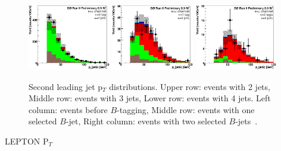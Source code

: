 \begin{figure}[!h!tbp]
\begin{center}
\includegraphics[width=0.32\textwidth]{eps/DataBackground/EMU/emu_EqZeroTag_EqFourJet_Jet2Pt.eps}
\includegraphics[width=0.32\textwidth]{eps/DataBackground/EMU/emu_EqOneTag_EqFourJet_Jet2Pt.eps}
\includegraphics[width=0.32\textwidth]{eps/DataBackground/EMU/emu_EqTwoTag_EqFourJet_Jet2Pt.eps}
\end{center}
\vspace{-0.1in}
\caption{Second leading jet p$_{T}$ distributions. Upper row: events with 2 jets, Middle row: events with 3 jets, Lower row: events with 4 jets. Left column: events before $B$-tagging, Middle row: events with one selected $B$-jet, Right column: events with two selected $B$-jets~\cite{singletopnote}.}
\label{Jet2pt}
\end{figure}




\clearpage
\begin{center}
LEPTON P$_{T}$
\end{center}

